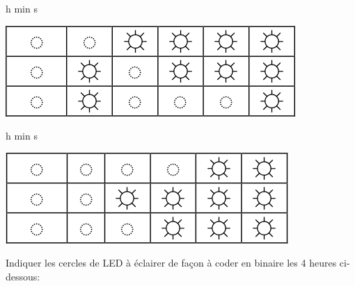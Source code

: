 \documentclass{article}
\begin{document}
\begin{minipage}[b]{.3\linewidth}
	\begin{Form}
		\begin{center}
			\TextField[name=bbc3h,width=2em]{}h \TextField[name=bbc3m,width=2em]{}min \TextField[name=bbc3s,width=2em]{}s
			\vspace{2em}
		\end{center}
	\end{Form}
\end{minipage}
\hfill
\begin{minipage}[b]{.6\linewidth}
	\centering
	\includegraphics[width=.7\linewidth]{./figures/bbc3.png}
\end{minipage}

\vspace{2em}

\begin{minipage}[b]{.3\linewidth}
	\begin{Form}
		\begin{center}
			\TextField[name=bbc4h,width=2em]{}h \TextField[name=bbc4m,width=2em]{}min \TextField[name=bbc4s,width=2em]{}s
			\vspace{2em}
		\end{center}
	\end{Form}
\end{minipage}
\hfill
\begin{minipage}[b]{.6\linewidth}
	\centering
	\includegraphics[width=.7\linewidth]{./figures/bbc4.png}
\end{minipage}

\vspace{2em}

Indiquer les cercles de LED à éclairer de façon à coder en binaire les 4 heures ci-dessous:

\vspace{2em}
\end{document}
